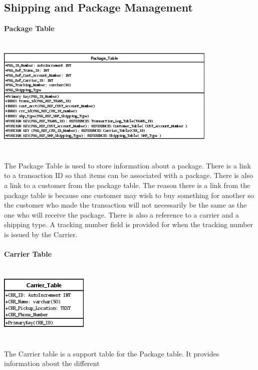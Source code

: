 \documentclass{report}
\begin{document}
	\newpage

	\subsection{Shipping and Package Management}

        {\bf Package Table}\\
        \\
        \\
        \includegraphics{Tables/PackageTable.png}\\
        \\
        \\
        The Package Table is used to store information about a package. There is a link to a transaction ID
        so that items can be associated with a package. There is also a link to a customer from the package
        table. The reason there is a link from the package table is because one customer may wish to buy
        something for another so the customer who made the transaction will not necessarily be the same as
        the one who will receive the package. There is also a reference to a carrier and a shipping type.
        A tracking number field is provided for when the tracking number is issued by the Carrier.
        \\
        \\
        {\bf Carrier Table}\\
        \\
        \\
        \includegraphics{Tables/CarrierTable.png}\\
        \\
        \\
        The Carrier table is a support table for the Package table. It provides information about the different
\end{document}
